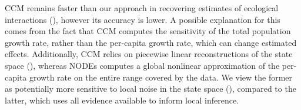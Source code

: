\documentclass[11pt, oneside]{article}
\begin{document}
CCM remains faster than our approach in recovering estimates of ecological interactions (\cite{Sugihara2012}), however its accuracy is lower.
A possible explanation for this comes from the fact that CCM computes the sensitivity of the total population growth rate, rather than the per-capita growth rate, which can change estimated effects.
Additionally, CCM relies on piecewise linear reconstructions of the state space (\cite{Deyle2015}), whereas NODEs computes a global nonlinear approximation of the per-capita growth rate on the entire range covered by the data.
We view the former as potentially more sensitive to local noise in the state space (\cite{Cenci2019a}), compared to the latter, which uses all evidence available to inform local inference.
\end{document}
